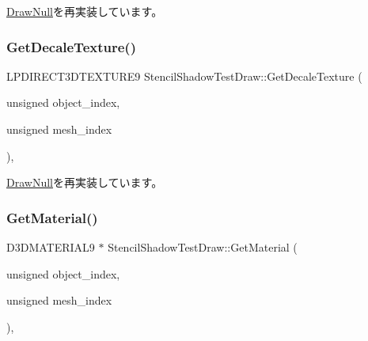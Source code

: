 \mbox{\hyperlink{class_draw_null_afe50f6fd820b18d673f70f048743f339}{Draw\+Null}}を再実装しています。

\mbox{\label{class_stencil_shadow_test_draw_a387a97781f743aa0ea0727c050ef53b2}} 
\subsubsection{\texorpdfstring{Get\+Decale\+Texture()}{GetDecaleTexture()}}
{\footnotesize\ttfamily L\+P\+D\+I\+R\+E\+C\+T3\+D\+T\+E\+X\+T\+U\+R\+E9 Stencil\+Shadow\+Test\+Draw\+::\+Get\+Decale\+Texture (\begin{DoxyParamCaption}\item[{unsigned}]{object\+\_\+index,  }\item[{unsigned}]{mesh\+\_\+index }\end{DoxyParamCaption})\hspace{0.3cm}{\ttfamily [override]}, {\ttfamily [virtual]}}



\mbox{\hyperlink{class_draw_null_a8496ed1b1f765a331a8f1704122b8ca4}{Draw\+Null}}を再実装しています。

\mbox{\label{class_stencil_shadow_test_draw_abfc9caaaa1b6120e2013701a9d264f2d}} 
\subsubsection{\texorpdfstring{Get\+Material()}{GetMaterial()}}
{\footnotesize\ttfamily D3\+D\+M\+A\+T\+E\+R\+I\+A\+L9 $\ast$ Stencil\+Shadow\+Test\+Draw\+::\+Get\+Material (\begin{DoxyParamCaption}\item[{unsigned}]{object\+\_\+index,  }\item[{unsigned}]{mesh\+\_\+index }\end{DoxyParamCaption})\hspace{0.3cm}{\ttfamily [override]}, {\ttfamily [virtual]}}




